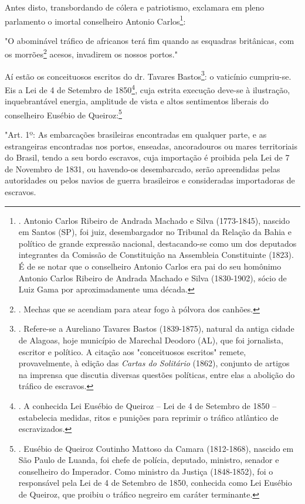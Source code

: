 Antes disto, transbordando de cólera e patriotismo, exclamara em pleno
parlamento o imortal conselheiro Antonio Carlos\footnote{. Antonio
  Carlos Ribeiro de Andrada Machado e Silva (1773-1845), nascido em
  Santos (SP), foi juiz, desembargador no Tribunal da Relação da Bahia e
  político de grande expressão nacional, destacando-se como um dos
  deputados integrantes da Comissão de Constituição na Assembleia
  Constituinte (1823). É de se notar que o conselheiro Antonio Carlos
  era pai do seu homônimo Antonio Carlos Ribeiro de Andrada Machado e
  Silva (1830-1902), sócio de Luiz Gama por aproximadamente uma década.}:

"O abominável tráfico de africanos terá fim quando as esquadras
britânicas, com os morrões\footnote{. Mechas que se acendiam para atear
  fogo à pólvora dos canhões.} acesos, invadirem os nossos portos."

Aí estão os conceituosos escritos do dr. Tavares Bastos\footnote{.
  Refere-se a Aureliano Tavares Bastos (1839-1875), natural da antiga
  cidade de Alagoas, hoje município de Marechal Deodoro (AL), que foi
  jornalista, escritor e político. A citação aos "conceituosos escritos"
  remete, provavelmente, à edição das \emph{Cartas do Solitário} (1862),
  conjunto de artigos na imprensa que discutia diversas questões
  políticas, entre elas a abolição do tráfico de escravos.}: o vaticínio
cumpriu-se. Eis a Lei de 4 de Setembro de 1850\footnote{. A conhecida
  Lei Eusébio de Queiroz -- Lei de 4 de Setembro de 1850 -- estabelecia
  medidas, ritos e punições para reprimir o tráfico atlântico de
  escravizados.}, cuja estrita execução deve-se à ilustração,
inquebrantável energia, amplitude de vista e altos sentimentos liberais
do conselheiro Eusébio de Queiroz:\footnote{. Eusébio de Queiroz
  Coutinho Mattoso da Camara (1812-1868), nascido em São Paulo de
  Luanda, foi chefe de polícia, deputado, ministro, senador e
  conselheiro do Imperador. Como ministro da Justiça (1848-1852), foi o
  responsável pela Lei de 4 de Setembro de 1850, conhecida como Lei
  Eusébio de Queiroz, que proibiu o tráfico negreiro em caráter
  terminante.}

"Art. 1º: As embarcações brasileiras encontradas em qualquer parte, e as
estrangeiras encontradas nos portos, enseadas, ancoradouros ou mares
territoriais do Brasil, tendo a seu bordo escravos, cuja importação é
proibida pela Lei de 7 de Novembro de 1831, ou havendo-os desembarcado,
serão apreendidas pelas autoridades ou pelos navios de guerra
brasileiros e consideradas importadoras de escravos.

